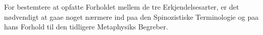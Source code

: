 \documentclass[12pt,a4paper]{book}
\newcommand{\opage}[1]{\marginnote{\footnotesize\textit{[#1]}}}
\begin{document}

\opage{96} \setcounter{footnote}{0}%
For bestemtere at opfatte Forholdet mellem de tre Erkjendelsesarter,
er det nødvendigt at gaae noget nærmere ind paa den Spinozistiske
Terminologie og paa hans Forhold til den tidligere Metaphysiks
Begreber.
\end{document}
